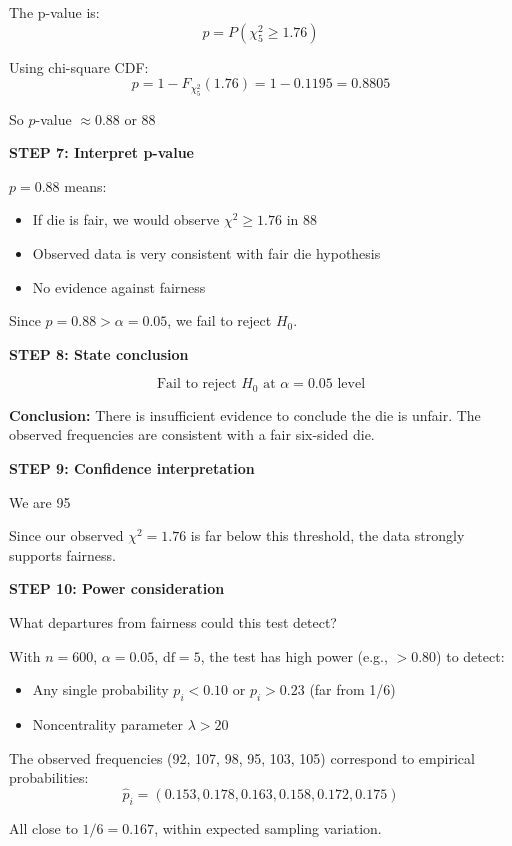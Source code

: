\documentclass[12pt]{article}
\begin{document}
\begin{solution}
The p-value is:
\[
p = P(\chi^2_5 \geq 1.76)
\]

Using chi-square CDF:
\[
p = 1 - F_{\chi^2_5}(1.76) = 1 - 0.1195 = 0.8805
\]

So $p$-value $\approx 0.88$ or 88%

\textbf{STEP 7: Interpret p-value}

$p = 0.88$ means:
\begin{itemize}
    \item If die is fair, we would observe $\chi^2 \geq 1.76$ in 88%
    \item Observed data is very consistent with fair die hypothesis
    \item No evidence against fairness
\end{itemize}

Since $p = 0.88 > \alpha = 0.05$, we fail to reject $H_0$.

\textbf{STEP 8: State conclusion}

\[
\boxed{\text{Fail to reject } H_0 \text{ at } \alpha = 0.05 \text{ level}}
\]

\textbf{Conclusion:} There is insufficient evidence to conclude the die is unfair. The observed frequencies are consistent with a fair six-sided die.

\textbf{STEP 9: Confidence interpretation}

We are 95%

Since our observed $\chi^2 = 1.76$ is far below this threshold, the data strongly supports fairness.

\textbf{STEP 10: Power consideration}

What departures from fairness could this test detect?

With $n = 600$, $\alpha = 0.05$, $\text{df} = 5$, the test has high power (e.g., $> 0.80$) to detect:
\begin{itemize}
    \item Any single probability $p_i < 0.10$ or $p_i > 0.23$ (far from 1/6)
    \item Noncentrality parameter $\lambda > 20$
\end{itemize}

The observed frequencies (92, 107, 98, 95, 103, 105) correspond to empirical probabilities:
\[
\hat{p}_i = (0.153, 0.178, 0.163, 0.158, 0.172, 0.175)
\]

All close to $1/6 = 0.167$, within expected sampling variation.

\end{solution}
\end{document}
